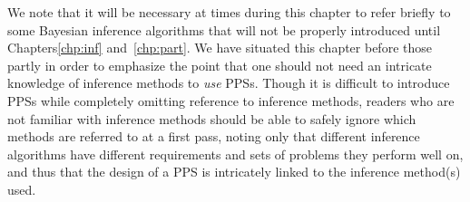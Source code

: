 
We note that it will be necessary at times during this chapter to refer briefly to some Bayesian inference
algorithms that will not be properly introduced until Chapters\ref{chp:inf} and~\ref{chp:part}.  
We have situated this chapter before those partly in order to emphasize the point that one should not 
need an intricate knowledge of inference methods to \emph{use} PPSs.  Though it is difficult
to introduce PPSs while completely omitting reference to inference methods, readers who
are not familiar with inference methods should be able to safely ignore which methods are referred to
at a first pass, noting only that different inference algorithms have different requirements and sets 
of problems they perform well on, and thus that the design of a PPS is intricately linked to the inference
method(s) used.







%
%
